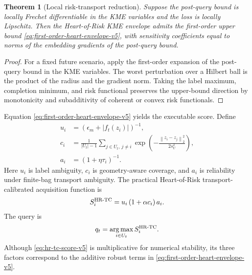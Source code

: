 \documentclass[10pt,journal]{IEEEtran}
\newtheorem{theorem}{Theorem}
\DeclareMathOperator*{\argmax}{arg\,max}
\newcommand{\norm}[1]{\left\lVert #1 \right\rVert}
\begin{document}
\begin{theorem}[Local risk-transport reduction]
\label{thm:local-risk-transport-v5}
Suppose the post-query bound is locally Frechet differentiable in the KME variables and the loss is locally Lipschitz. Then the Heart-of-Risk KME envelope admits the first-order upper bound \eqref{eq:first-order-heart-envelope-v5}, with sensitivity coefficients equal to norms of the embedding gradients of the post-query bound.
\end{theorem}

\begin{proof}
For a fixed future scenario, apply the first-order expansion of the post-query bound in the KME variables. The worst perturbation over a Hilbert ball is the product of the radius and the gradient norm. Taking the label maximum, completion minimum, and risk functional preserves the upper-bound direction by monotonicity and subadditivity of coherent or convex risk functionals.
\end{proof}

Equation \eqref{eq:first-order-heart-envelope-v5} yields the executable score. Define
\begin{align}
    u_i &= (\epsilon_m+|f_t(z_i)|)^{-1},\label{eq:u-v5}\\
    c_i &= \frac{1}{|U_t|-1}\sum_{j\in U_t,\,j\ne i}
    \exp\!\left(-\frac{\norm{z_i-z_j}_2^2}{2s_U^2}\right),\label{eq:c-v5}\\
    a_i &= (1+\eta\tau_i)^{-1}.\label{eq:a-v5}
\end{align}
Here $u_i$ is label ambiguity, $c_i$ is geometry-aware coverage, and $a_i$ is reliability under finite-bag transport ambiguity. The practical Heart-of-Risk transport-calibrated acquisition function is
\begin{equation}
\label{eq:hr-tc-score-v5}
    S_i^{\rm HR\text{-}TC}=u_i\,(1+\alpha c_i)\,a_i.
\end{equation}
The query is
\begin{equation}
    q_t=\argmax_{i\in U_t}S_i^{\rm HR\text{-}TC}.
\end{equation}
Although \eqref{eq:hr-tc-score-v5} is multiplicative for numerical stability, its three factors correspond to the additive robust terms in \eqref{eq:first-order-heart-envelope-v5}.
\end{document}
